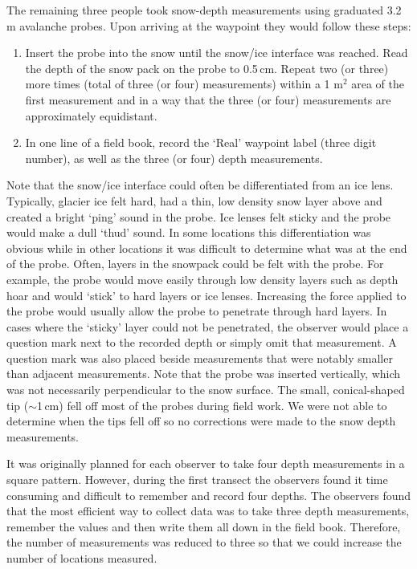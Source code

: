 \documentclass{sfuthesis}
\begin{document}
The remaining three people took snow-depth measurements using graduated 3.2 m avalanche probes. Upon arriving at the waypoint they would follow these steps:
\begin{enumerate}
\item Insert the probe into the snow until the snow/ice interface was reached. Read the depth of the snow pack on the probe to 0.5\,cm. Repeat two (or three) more times (total of three (or four) measurements) within a 1 m$^2$ area of the first measurement and in a way that the three (or four) measurements are approximately equidistant. 
\item In one line of a field book, record the `Real' waypoint label (three digit number), as well as the three (or four) depth measurements. 
\end{enumerate}
Note that the snow/ice interface could often be differentiated from an ice lens. Typically, glacier ice felt hard, had a thin, low density snow layer above and created a bright `ping' sound in the probe. Ice lenses felt sticky and the probe would make a dull `thud' sound. In some locations this differentiation was obvious while in other locations it was difficult to determine what was at the end of the probe. Often, layers in the snowpack could be felt with the probe. For example, the probe would move easily through low density layers such as depth hoar and would `stick' to hard layers or ice lenses. Increasing the force applied to the probe would usually allow the probe to penetrate through hard layers. In cases where the `sticky' layer could not be penetrated, the observer would place a question mark next to the recorded depth or simply omit that measurement. A question mark was also placed beside measurements that were notably smaller than adjacent measurements. Note that the probe was inserted vertically, which was not necessarily perpendicular to the snow surface. The small, conical-shaped tip ($\sim$1\,cm) fell off most of the probes during field work. We were not able to determine when the tips fell off so no corrections were made to the snow depth measurements. 

It was originally planned for each observer to take four depth measurements in a square pattern. However, during the first transect the observers found it time consuming and difficult to remember and record four depths. The observers found that the most efficient way to collect data was to take three depth measurements, remember the values and then write them all down in the field book. Therefore, the number of measurements was reduced to three so that we could increase the number of locations measured. 
\end{document}
